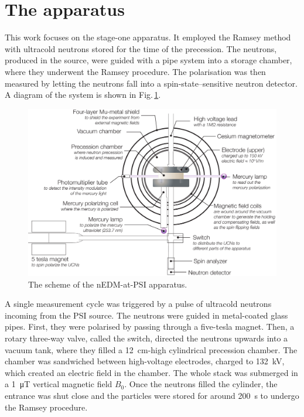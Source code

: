 \section{The apparatus}
This work focuses on the stage-one apparatus. It employed the Ramsey method with ultracold neutrons stored for the time of the precession. The neutrons, produced in the source, were guided with a pipe system into a storage chamber, where they underwent the Ramsey procedure. The polarisation was then measured by letting the neutrons fall into a spin-state--sensitive neutron detector. A diagram of the system is shown in Fig.\,\ref{fig:nEDM_scheme}.

\begin{figure}
  \centering
  \includegraphics[width=\linewidth]{gfx/nEDMatPSI/apparatus-cartoon-main-and-sub-labels.pdf}
  \caption{The scheme of the nEDM-at-PSI apparatus. }
  \label{fig:nEDM_scheme}
\end{figure}

A single measurement cycle was triggered by a pulse of ultracold neutrons incoming from the PSI source. The neutrons were guided in metal-coated glass pipes. First, they were polarised by passing through a five-tesla magnet. Then, a rotary three-way valve, called the switch, directed the neutrons upwards into a vacuum tank, where they filled a \SI{12}{\centi\meter}-high cylindrical precession chamber. The chamber was sandwiched between high-voltage electrodes, charged to \SI{132}{\kilo\volt}, which created an electric field in the chamber. The whole stack was submerged in a \SI{1}{\micro\tesla} vertical magnetic field $B_0$. Once the neutrons filled the cylinder, the entrance was shut close and the particles were stored for around \SI{200}{\second} to undergo the Ramsey procedure.

